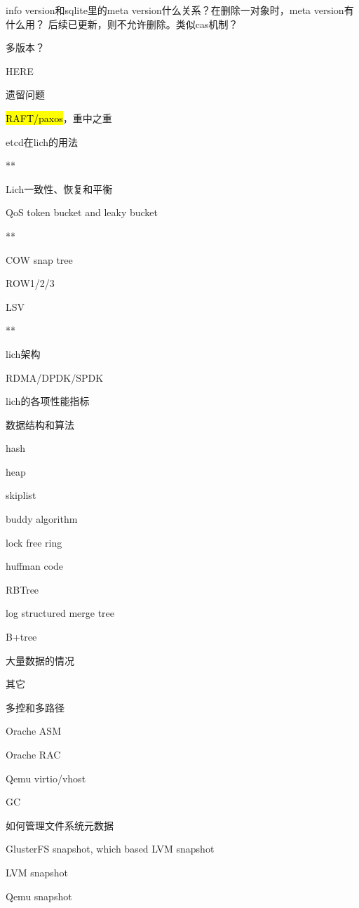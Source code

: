 info version和sqlite里的meta version什么关系？在删除一对象时，meta version有什么用？ 后续已更新，则不允许删除。类似cas机制？

多版本？

\hrulefill

HERE

遗留问题
\begin{enumbox}
\item \hl{RAFT/paxos}，重中之重
\item etcd在lich的用法
\item ***
\item Lich一致性、恢复和平衡
\item QoS token bucket and leaky bucket
\item ***
\item COW snap tree
\item ROW1/2/3
\item LSV
\item ***
\item lich架构
\item RDMA/DPDK/SPDK
\item lich的各项性能指标
\end{enumbox}

数据结构和算法
\begin{enumbox}
\item hash
\item heap
\item skiplist
\item buddy algorithm
\item lock free ring
\item huffman code
\item RBTree
\item log structured merge tree
\item B+tree
\item 大量数据的情况
\end{enumbox}

其它
\begin{enumbox}
\item 多控和多路径
\item Orache ASM
\item Orache RAC
\item Qemu virtio/vhost
\item GC
\item 如何管理文件系统元数据
\item GlusterFS snapshot, which based LVM snapshot
\item LVM snapshot
\item Qemu snapshot
\end{enumbox}

